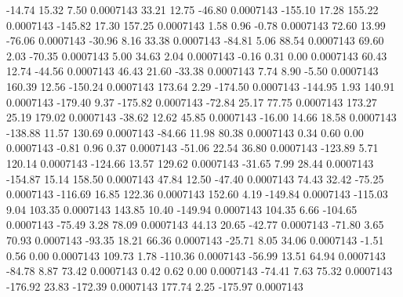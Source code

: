       -14.74       15.32        7.50     0.0007143
       33.21       12.75      -46.80     0.0007143
     -155.10       17.28      155.22     0.0007143
     -145.82       17.30      157.25     0.0007143
        1.58        0.96       -0.78     0.0007143
       72.60       13.99      -76.06     0.0007143
      -30.96        8.16       33.38     0.0007143
      -84.81        5.06       88.54     0.0007143
       69.60        2.03      -70.35     0.0007143
        5.00       34.63        2.04     0.0007143
       -0.16        0.31        0.00     0.0007143
       60.43       12.74      -44.56     0.0007143
       46.43       21.60      -33.38     0.0007143
        7.74        8.90       -5.50     0.0007143
      160.39       12.56     -150.24     0.0007143
      173.64        2.29     -174.50     0.0007143
     -144.95        1.93      140.91     0.0007143
     -179.40        9.37     -175.82     0.0007143
      -72.84       25.17       77.75     0.0007143
      173.27       25.19      179.02     0.0007143
      -38.62       12.62       45.85     0.0007143
      -16.00       14.66       18.58     0.0007143
     -138.88       11.57      130.69     0.0007143
      -84.66       11.98       80.38     0.0007143
        0.34        0.60        0.00     0.0007143
       -0.81        0.96        0.37     0.0007143
      -51.06       22.54       36.80     0.0007143
     -123.89        5.71      120.14     0.0007143
     -124.66       13.57      129.62     0.0007143
      -31.65        7.99       28.44     0.0007143
     -154.87       15.14      158.50     0.0007143
       47.84       12.50      -47.40     0.0007143
       74.43       32.42      -75.25     0.0007143
     -116.69       16.85      122.36     0.0007143
      152.60        4.19     -149.84     0.0007143
     -115.03        9.04      103.35     0.0007143
      143.85       10.40     -149.94     0.0007143
      104.35        6.66     -104.65     0.0007143
      -75.49        3.28       78.09     0.0007143
       44.13       20.65      -42.77     0.0007143
      -71.80        3.65       70.93     0.0007143
      -93.35       18.21       66.36     0.0007143
      -25.71        8.05       34.06     0.0007143
       -1.51        0.56        0.00     0.0007143
      109.73        1.78     -110.36     0.0007143
      -56.99       13.51       64.94     0.0007143
      -84.78        8.87       73.42     0.0007143
        0.42        0.62        0.00     0.0007143
      -74.41        7.63       75.32     0.0007143
     -176.92       23.83     -172.39     0.0007143
      177.74        2.25     -175.97     0.0007143
